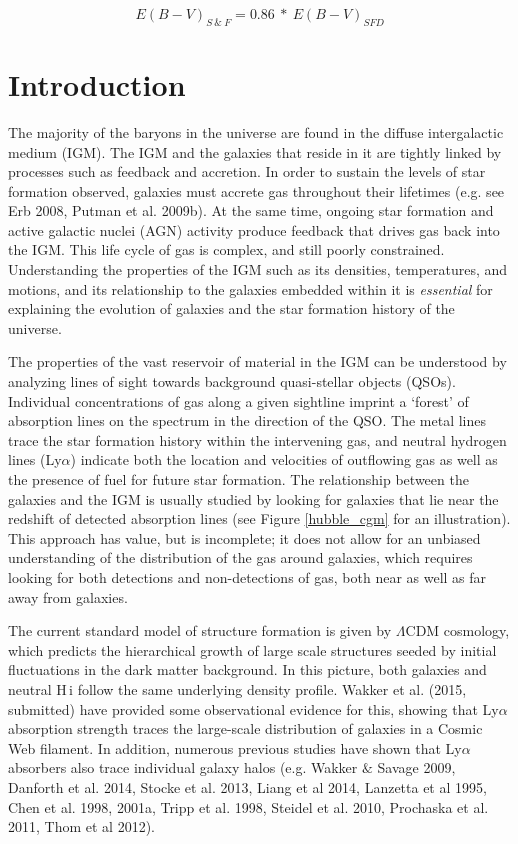 \documentclass[iop]{emulateapj-rtx4}
\begin{document}
\begin{equation}
E(B-V)_{S~\&~F} = 0.86~*~ E(B-V)_{SFD}
\end{equation}
 
 
 
\section{Introduction}

\indent The majority of the baryons in the universe are found in the diffuse intergalactic medium (IGM). The IGM and the galaxies that reside in it are tightly linked by processes such as feedback and accretion. In order to sustain the levels of star formation observed, galaxies must accrete gas throughout their lifetimes (e.g. see Erb 2008, Putman et al. 2009b). At the same time, ongoing star formation and active galactic nuclei (AGN) activity produce feedback that drives gas back into the IGM. This life cycle of gas is complex, and still poorly constrained. Understanding the properties of the IGM such as its densities, temperatures, and motions, and its relationship to the galaxies embedded within it is \textit{essential} for explaining the evolution of galaxies and the star formation history of the universe. 

\indent The properties of the vast reservoir of material in the IGM can be understood by analyzing lines of sight towards background quasi-stellar objects (QSOs). Individual concentrations of gas along a given sightline imprint a `forest' of absorption lines on the spectrum in the direction of the QSO. The metal lines trace the star formation history within the intervening gas, and neutral hydrogen lines (Ly$\alpha$) indicate both the location and velocities of outflowing gas as well as the presence of fuel for future star formation. The relationship between the galaxies and the IGM is usually studied by looking for galaxies that lie near the redshift of detected absorption lines (see Figure \ref{hubble_cgm} for an illustration). This approach has value, but is incomplete; it does not allow for an unbiased understanding of the distribution of the gas around galaxies, which requires looking for both detections and non-detections of gas, both near as well as far away from galaxies.

\indent The current standard model of structure formation is given by $\Lambda$CDM cosmology, which predicts the hierarchical growth of large scale structures seeded by initial fluctuations in the dark matter background. In this picture, both galaxies and neutral H\,{\sc i} follow the same underlying density profile. Wakker et al. (2015, submitted) have provided some observational evidence for this, showing that Ly$\alpha$ absorption strength traces the large-scale distribution of galaxies in a Cosmic Web filament. In addition, numerous previous studies have shown that Ly$\alpha$ absorbers also trace individual galaxy halos (e.g. Wakker $\&$ Savage 2009, Danforth et al. 2014, Stocke et al. 2013, Liang et al 2014, Lanzetta et al 1995, Chen et al. 1998, 2001a, Tripp et al. 1998, Steidel et al. 2010, Prochaska et al. 2011, Thom et al 2012). 
\end{document}
